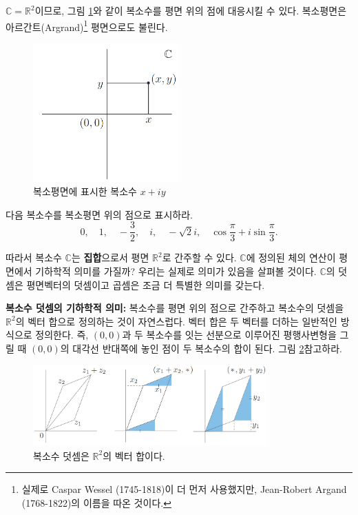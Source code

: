 $\mathbb C = \mathbb R^2$이므로, 
그림 \ref{fig-1-2}와 같이 복소수를 평면 위의 점에 대응시킬 수 있다.
복소평면은  아르간트(Argrand)\footnote{ 
실제로 Caspar Wessel (1745-1818)이 더 먼저 사용했지만,
Jean-Robert Argand (1768-1822)의 이름을 따온 것이다.} 
평면으로도 불린다.

\begin{figure}[!h]
\begin{center}
\includegraphics[width=0.5\textwidth]{./SaltChapter/figs/fig-1-2}
\end{center}
\caption{복소평면에 표시한 복소수 $x+iy$}
\label{fig-1-2}
\end{figure}


\begin{salt_exercise} \label{ex-1-4}
다음 복소수를 복소평면 위의 점으로 표시하라.
$$
0, \quad 1 , \quad -\frac32, \quad i, \quad -\sqrt{2}i,
\quad \cos \frac\pi3 + i\sin\frac\pi3.
$$
\end{salt_exercise}

따라서 복소수 $\mathbb C$는 {\bf 집합}으로서 평면 $\mathbb R^2$로 간주할 수 있다.
$\mathbb C$에 정의된 체의 연산이 평면에서 기하학적 의미를 가질까?
우리는 실제로 의미가 있음을 살펴볼 것이다.
$\mathbb C$의 덧셈은 평면벡터의 덧셈이고
곱셈은 조금 더 특별한 의미를 갖는다.

{\bf 복소수 덧셈의 기하학적 의미: }
복소수를 평면 위의 점으로 간주하고 복소수의 덧셈을 $\mathbb R^2$의 벡터 합으로 
정의하는 것이 자연스럽다. 
벡터 합은 두 벡터를 더하는 일반적인 방식으로 정의한다.
즉, $(0,0)$과 두 복소수를 잇는 선분으로 이루어진 평행사변형을 그릴 때
$(0,0)$의 대각선 반대쪽에 놓인 점이 두 복소수의 합이 된다.
그림 \ref{fig-1-3}\을 참고하라.

\begin{figure}[!h]
\begin{center}
\includegraphics[width=0.8\textwidth]{./SaltChapter/figs/fig-1-3}
\end{center}
\caption{복소수 덧셈은 $\mathbb R^2$의 벡터 합이다.}
\label{fig-1-3}
\end{figure}

